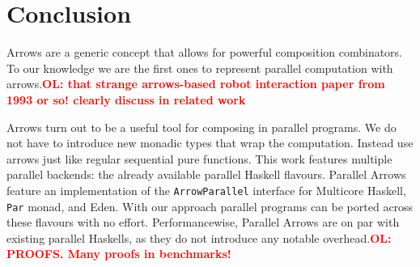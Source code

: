 \documentclass{jfp1}
\newcommand{\inlinecode}[1]{\texttt{#1}}
\newcommand{\comm}[2]{\textcolor{red}{\bfseries #1: #2}}
\newcommand{\olcomment}[1]{\comm{OL}{#1}}
\begin{document}



	\section{Conclusion}
\label{sec:conclusion}
Arrows are a generic concept that allows for powerful composition combinators. To our knowledge we are the first ones to represent parallel computation with arrows.\olcomment{that strange arrows-based robot interaction paper from 1993 or so! clearly discuss in related work}

Arrows turn out to be a useful tool for composing in parallel programs. We do not have to introduce new monadic types that wrap the computation. Instead use arrows just like regular sequential pure functions. 
%
This work features multiple parallel backends: the already available parallel Haskell flavours. Parallel Arrows feature an implementation of the \inlinecode{ArrowParallel} interface for Multicore Haskell, \inlinecode{Par} monad, and Eden. With our approach parallel programs can be ported across these flavours with no effort.
%
%
Performancewise, Parallel Arrows are on par with existing parallel Haskells, as they do not introduce any notable overhead.\olcomment{PROOFS. Many proofs in benchmarks!}
\end{document}
